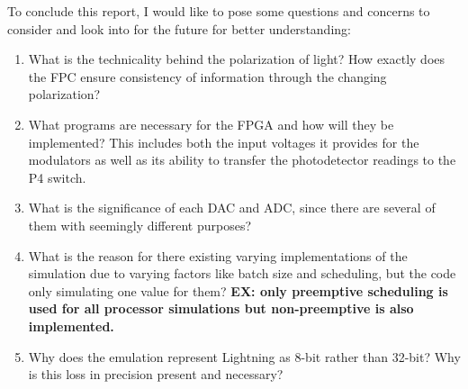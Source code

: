 \documentclass[11pt]{article}
\begin{document}
To conclude this report, I would like to pose some questions and concerns to consider and look into for the future for better understanding:

\begin{enumerate}
    \item What is the technicality behind the polarization of light? How exactly does the FPC ensure consistency of information through the changing polarization?
    \item What programs are necessary for the FPGA and how will they be implemented? This includes both the input voltages it provides for the modulators as well as its ability to transfer the photodetector readings to the P4 switch.
    \item What is the significance of each DAC and ADC, since there are several of them with seemingly different purposes?
    \item What is the reason for there existing  varying implementations of the simulation due to varying factors like batch size and scheduling, but the code only simulating one value for them? \textbf{EX: only preemptive scheduling is used for all processor simulations but non-preemptive is also implemented.}
    \item Why does the emulation represent Lightning as 8-bit rather than 32-bit? Why is this loss in precision present and necessary?
    
\end{enumerate}
\end{document}
